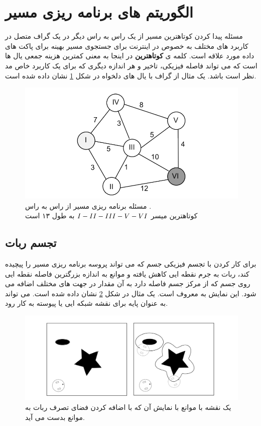 \section{الگوریتم های برنامه ریزی مسیر}
مسئله پیدا کردن کوتاهترین مسیر از یک راس به راس دیگر در یک گراف متصل در کاربرد های
 مختلف به خصوص در اینترنت برای جستجوی  مسیر بهینه برای پاکت های داده مورد علاقه است.
کلمه ی
\textbf{کوتاهترین}
در اینجا به معنی کمترین هزینه جمعی یال ها است که می تواند فاصله فیزیکی، تاخیر و هر اندازه دیگری که برای یک کاربرد خاص مد نظر است باشد. یک مثال از گراف با یال های دلخواه در شکل
\ref{fig:graph}
نشان داده شده است. 

\begin{figure}[H]
  \includegraphics[width = \textwidth]{images/graph.png}
  \caption{مسئله برنامه ریزی مسیر از راس
  به راس
  .
  \\
  کوتاهترین میسر 
  $\rom{1}-\rom{2}-\rom{3}-\rom{5}-\rom{6}$
  به طول ۱۳ است
  }
  \label{fig:graph}
\end{figure}
\subsection{تجسم ربات}
برای کار کردن با تجسم فیزیکی جسم که می تواند پروسه برنامه ریزی مسیر را  پیچیده کند، ربات به جرم
 نقطه ایی کاهش یافته و موانع به اندازه بزرگترین فاصله نقطه ایی روی جسم  که از مرکز جسم فاصله
 دارد به آن مقدار  در جهت های مختلف اضافه می شود. این نمایش به 
معروف است. یک مثال در شکل
\ref{fig:conf-space}
نشان داده شده است.
می تواند به عنوان پایه برای نقشه شبکه ایی یا پیوسته به کار رود.
\begin{figure}[H]
  \includegraphics[width = \textwidth]{images/conf-space.png}
  \caption{
  یک نقشه با موانع با نمایش 
  آن که با اضافه کردن فضای تصرف ربات به موانع بدست می آید.
  }
  \label{fig:conf-space}
\end{figure}
